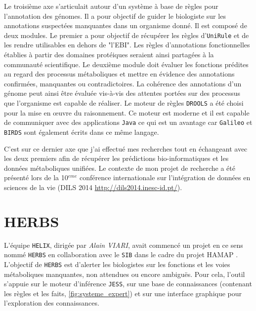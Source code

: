 \begin{refsegment}
Le troisième axe s'articulait autour d'un système à base de règles pour l'annotation des génomes. Il a pour objectif de guider le biologiste sur les annotations suspectées manquantes dans un organisme donné. Il est composé de deux modules. Le premier a pour objectif de récupérer les règles d'\texttt{UniRule} et de les rendre utilisables en dehors de "l'\gls{EBI}". Les règles d'annotations fonctionnelles établies à partir des domaines protéiques seraient ainsi partagées à la communauté scientifique. Le deuxième module doit évaluer les fonctions prédites au regard des processus métaboliques et mettre en évidence des annotations confirmées, manquantes ou contradictoires. La cohérence des annotations d'un génome peut ainsi être évaluée vis-à-vis des attentes portées sur des processus que l'organisme est capable de réaliser. Le moteur de règles \texttt{DROOLS} a été choisi pour la mise en œuvre du raisonnement. Ce moteur est moderne et il est capable de communiquer avec des applications  \texttt{Java} ce  qui est un avantage car \texttt{Galileo} et \texttt{BIRDS} sont également écrits dans ce même langage.

C'est sur ce dernier axe que j'ai effectué mes recherches tout en échangeant avec les deux premiers afin de récupérer les prédictions bio-informatiques et les données métaboliques unifiées. Le contexte de mon projet de recherche a été présenté lors de la 10$^{eme}$ conférence internationale sur l'intégration de données en sciences de la vie (DILS 2014 \url{http://dils2014.inesc-id.pt/}).



\section{HERBS}

L'équipe \texttt{HELIX}, dirigée par \textit{Alain VIARI}, avait commencé un projet en ce sens nommé \texttt{\gls{HERBS}} en collaboration avec le \texttt{\gls{SIB}} dans le cadre du projet \gls{HAMAP} \cite{pedruzzi2015hamap}. L'objectif de \texttt{\gls{HERBS}} est d'alerter les biologistes sur les fonctions et les voies métaboliques manquantes, non attendues ou encore ambiguës. Pour cela, l'outil s'appuie sur le moteur d'inférence \texttt{\gls{JESS}}, sur une base de connaissances (contenant les règles et les faits, \cref{fig:systeme_expert}) et sur une interface graphique pour l'exploration des connaissances. 


\end{refsegment}
